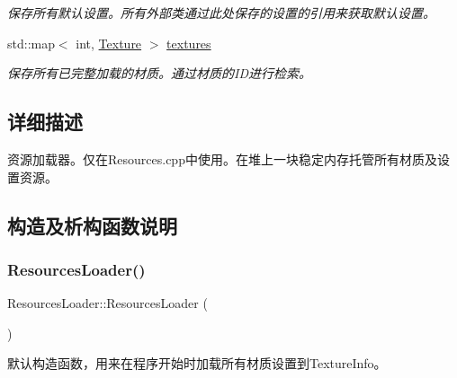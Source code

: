 \begin{DoxyCompactItemize}
\begin{tabbing}
\end{tabbing}\begin{DoxyCompactList}\small\item\em 保存所有默认设置。所有外部类通过此处保存的设置的引用来获取默认设置。 \end{DoxyCompactList}\item 
\mbox{\label{class_resources_loader_a5b18435b040ae9562a84570712be922c}} 
std\+::map$<$ int, \hyperlink{struct_texture}{Texture} $>$ \hyperlink{class_resources_loader_a5b18435b040ae9562a84570712be922c}{textures}
\begin{DoxyCompactList}\small\item\em 保存所有已完整加载的材质。通过材质的\+I\+D进行检索。 \end{DoxyCompactList}\end{DoxyCompactItemize}


\subsection{详细描述}
资源加载器。仅在Resources.\+cpp中使用。在堆上一块稳定内存托管所有材质及设置资源。 



\subsection{构造及析构函数说明}
\mbox{\label{class_resources_loader_a571b6232d8f1dc1cf94ec752c984a834}} 
\subsubsection{\texorpdfstring{Resources\+Loader()}{ResourcesLoader()}}
{\footnotesize\ttfamily Resources\+Loader\+::\+Resources\+Loader (\begin{DoxyParamCaption}{ }\end{DoxyParamCaption})}



默认构造函数，用来在程序开始时加载所有材质设置到Texture\+Info。 

\mbox{\label{class_resources_loader_ab4f7fa273471e91107896131bce915da}} 
